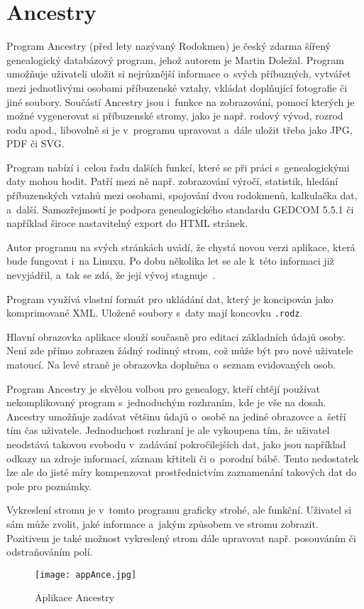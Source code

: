 		\section{Ancestry}
		\label{sec:ance}
		Program Ancestry (před lety nazývaný Rodokmen) je český zdarma šířený genealogický databázový program, jehož autorem je Martin Doležal. Program umožňuje uživateli uložit si nejrůznější informace o~svých příbuzných, vytvářet mezi jednotlivými osobami příbuzenské vztahy, vkládat doplňující fotografie či jiné soubory. Součástí Ancestry jsou i~funkce na zobrazování, pomocí kterých je možné vygenerovat si příbuzenské stromy, jako je např. rodový vývod, rozrod rodu apod., libovolně si je v~programu upravovat a~dále uložit třeba jako JPG, PDF či SVG. \par
		Program nabízí i~celou řadu dalších funkcí, které se při práci s~genealogickými daty mohou hodit. Patří mezi ně např. zobrazování výročí, statistik, hledání příbuzenských vztahů mezi osobami, spojování dvou rodokmenů, kalkulačka dat, a~další. Samozřejmostí je podpora genealogického standardu GEDCOM 5.5.1 či například široce nastavitelný export do HTML stránek. \par
		Autor programu na svých stránkách uvádí, že chystá novou verzi aplikace, která bude fungovat i~na Linuxu. Po dobu několika let se ale k~této informaci již nevyjádřil, a~tak se zdá, že její vývoj stagnuje~\cite{bib:ApliAnceHome}. \par
		Program využívá vlastní formát pro ukládání dat, který je koncipován jako komprimované XML. Uložené soubory s~daty mají koncovku \texttt{.rodz}. \par
		Hlavní obrazovka aplikace slouží současně pro editaci základních údajů osoby. Není zde přímo zobrazen žádný rodinný strom, což může být pro nové uživatele matoucí. Na levé straně je obrazovka doplněna o~seznam evidovaných osob. \par
		Program Ancestry je skvělou volbou pro genealogy, kteří chtějí používat nekomplikovaný program s~jednoduchým rozhraním, kde je vše na dosah. Ancestry umožňuje zadávat většinu údajů o~osobě na jediné obrazovce a~šetří tím čas uživatele. Jednoduchost rozhraní je ale vykoupena tím, že uživatel neodstává takovou svobodu v~zadávání pokročilejších dat, jako jsou například odkazy na zdroje informací, záznam křtiteli či o~porodní bábě. Tento nedostatek lze ale do jisté míry kompenzovat prostřednictvím zaznamenání takových dat do pole pro poznámky. \par
		Vykreslení stromu je v~tomto programu graficky strohé, ale funkční. Uživatel si sám může zvolit, jaké informace a~jakým způsobem ve stromu zobrazit. Pozitivem je také možnost vykreslený strom dále upravovat např. posouváním či odstraňováním polí. \par
		\begin{figure}[H]
			\centering
			\texttt{[image: appAnce.jpg]}
			\caption{Aplikace Ancestry}
		\end{figure}

